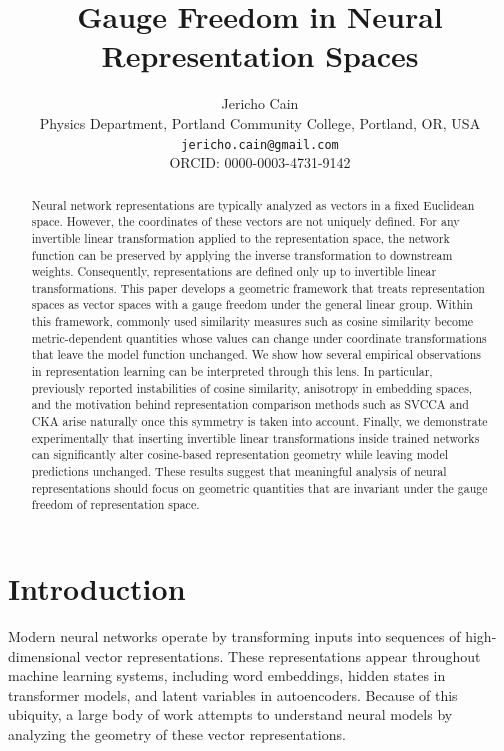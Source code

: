 \documentclass[11pt]{article}
\title{Gauge Freedom in Neural Representation Spaces}
\author{
Jericho Cain\\
Physics Department, Portland Community College, Portland, OR, USA\\
\texttt{jericho.cain@gmail.com}\\
ORCID: 0000-0003-4731-9142
}
\begin{document}

\maketitle

\begin{abstract}

Neural network representations are typically analyzed as vectors in a fixed Euclidean space.
However, the coordinates of these vectors are not uniquely defined.
For any invertible linear transformation applied to the representation space,
the network function can be preserved by applying the inverse transformation
to downstream weights.
Consequently, representations are defined only up to invertible linear
transformations.
This paper develops a geometric framework that treats representation spaces
as vector spaces with a gauge freedom under the general linear group.
Within this framework, commonly used similarity measures such as cosine
similarity become metric-dependent quantities whose values can change under
coordinate transformations that leave the model function unchanged.
We show how several empirical observations in representation learning can be
interpreted through this lens.
In particular, previously reported instabilities of cosine similarity,
anisotropy in embedding spaces, and the motivation behind representation
comparison methods such as SVCCA and CKA arise naturally once this symmetry
is taken into account.
Finally, we demonstrate experimentally that inserting invertible linear
transformations inside trained networks can significantly alter cosine-based
representation geometry while leaving model predictions unchanged.
These results suggest that meaningful analysis of neural representations
should focus on geometric quantities that are invariant under the gauge
freedom of representation space.

\end{abstract}

\section{Introduction}

Modern neural networks operate by transforming inputs into sequences of
high-dimensional vector representations.
These representations appear throughout machine learning systems, including
word embeddings, hidden states in transformer models, and latent variables
in autoencoders.
Because of this ubiquity, a large body of work attempts to understand neural
models by analyzing the geometry of these vector representations.
\end{document}
